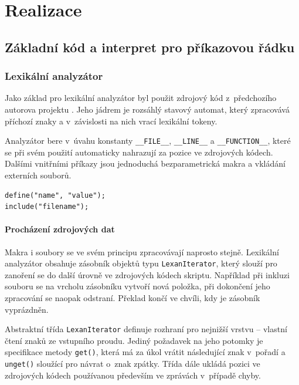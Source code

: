 \documentclass[11pt,twoside,a4paper]{book}
\begin{document}
\chapter{Realizace}


\section{Základní kód a interpret pro příkazovou řádku}

\subsection{Lexikální analyzátor}

Jako základ pro lexikální analyzátor byl použit zdrojový kód z~předchozího autorova projektu \cite[třída \texttt{CLexan}]{borsch}. Jeho jádrem je rozsáhlý stavový automat, který zpracovává příchozí znaky a v~závislosti na nich vrací lexikální tokeny.

Analyzátor bere v~úvahu konstanty \texttt{\_\_FILE\_\_}, \texttt{\_\_LINE\_\_} a \texttt{\_\_FUNCTION\_\_}, které se při svém použití automaticky nahrazují za pozice ve zdrojových kódech. Dalšími vnitřními příkazy jsou jednoduchá bezparametrická makra a vkládání externích souborů.

\begin{verbatim}
define("name", "value");
include("filename");
\end{verbatim}


\subsubsection{Procházení zdrojových dat}

Makra i soubory se ve svém principu zpracovávají naprosto stejně. Lexikální analyzátor obsahuje zásobník objektů typu \texttt{LexanIterator}, který slouží pro zanoření se do další úrovně ve zdrojových kódech skriptu. Například při inkluzi souboru se na vrcholu zásobníku vytvoří nová položka, při dokončení jeho zpracování se naopak odstraní. Překlad končí ve chvíli, kdy je zásobník vyprázdněn.

Abstraktní třída \texttt{LexanIterator} definuje rozhraní pro nejnižší vrstvu -- vlastní čtení znaků ze vstupního proudu. Jediný požadavek na jeho potomky je specifikace metody \texttt{get()}, která má za úkol vrátit následující znak v~pořadí a \texttt{unget()} sloužící pro návrat o~znak zpátky. Třída dále ukládá pozici ve zdrojových kódech používanou především ve zprávách v~případě chyby.
\end{document}
